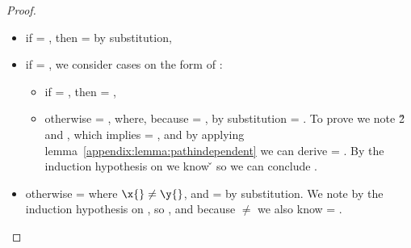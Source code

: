 \begin{lemma}
\begin{proof}
\begin{case}[T-App]
\begin{itemize}
\begin{subcase}[B-BetaClosure]
         \begin{itemize}
           \item if  = \emptyobject{}, then \object{} = \emptyobject{} by substitution,
           \item if  = { {\x{}}}, 
             we consider cases on the form of :
             \begin{itemize}
               \item if  = \emptyobject{}, then \object{} = \emptyobject{},
               \item otherwise  = { {\y{}}}, where,
                 because
                \object{} = {
                                         {}
                                         {\x{}}},
                 by substitution
                 \object{} = { {}}.
                 To prove \inopenv{\openv{}}{\object{}}{\v{}}
                 we note 
                          {\x{}}
                          {\v{2}}
                          and 
                 ,
                 which implies 
                  = 
                 ,
                 and by applying lemma~\ref{appendix:lemma:pathindependent}
                 we can derive
                  =
                             { {\x{}}}.
                 By the induction hypothesis on {}
                 we know
                          { {\x{}}}
                          {\v{}}
                 so we can conclude
                 .

             \end{itemize}
           \item otherwise  = { {\y{}}} where $\x{} \not= \y{}$,
             and \object{} =  by substitution.
             We note  
             by the induction hypothesis on {},
             so 
             ,
           and because {\x{}} $\not=$ {\y{}}
            we also know
              = 
             \inopenvnoeq{\openv{}}{\y{}}.


\end{itemize}
\end{subcase}
\end{itemize}
\end{case}
\end{proof}
\end{lemma}
